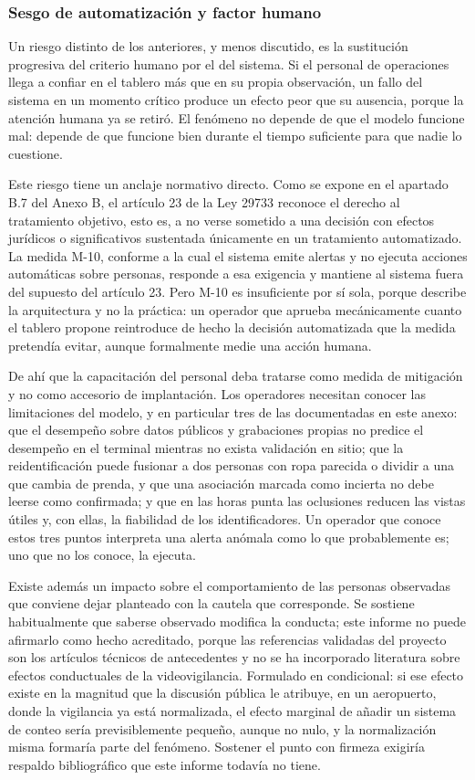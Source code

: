 \subsubsection{Sesgo de automatización y factor humano}

Un riesgo distinto de los anteriores, y menos discutido, es la
sustitución progresiva del criterio humano por el del sistema. Si el
personal de operaciones llega a confiar en el tablero más que en su
propia observación, un fallo del sistema en un momento crítico produce
un efecto peor que su ausencia, porque la atención humana ya se retiró.
El fenómeno no depende de que el modelo funcione mal: depende de que
funcione bien durante el tiempo suficiente para que nadie lo cuestione.

Este riesgo tiene un anclaje normativo directo. Como se expone en el
apartado B.7 del Anexo B, el artículo 23 de la Ley 29733 reconoce el
derecho al tratamiento objetivo, esto es, a no verse sometido a una
decisión con efectos jurídicos o significativos sustentada únicamente en
un tratamiento automatizado. La medida M-10, conforme a la cual el
sistema emite alertas y no ejecuta acciones automáticas sobre personas,
responde a esa exigencia y mantiene al sistema fuera del supuesto del
artículo 23. Pero M-10 es insuficiente por sí sola, porque describe la
arquitectura y no la práctica: un operador que aprueba mecánicamente
cuanto el tablero propone reintroduce de hecho la decisión automatizada
que la medida pretendía evitar, aunque formalmente medie una acción
humana.

De ahí que la capacitación del personal deba tratarse como medida de
mitigación y no como accesorio de implantación. Los operadores necesitan
conocer las limitaciones del modelo, y en particular tres de las
documentadas en este anexo: que el desempeño sobre datos públicos y grabaciones propias no predice
el desempeño en el terminal mientras no exista validación en sitio; que la
reidentificación puede fusionar a dos personas con ropa parecida o dividir a
una que cambia de prenda, y que una asociación marcada como incierta no debe
leerse como confirmada; y que en las horas punta las oclusiones reducen las
vistas útiles y, con ellas, la fiabilidad de los identificadores. Un operador que conoce estos tres puntos
interpreta una alerta anómala como lo que probablemente es; uno que no
los conoce, la ejecuta.

Existe además un impacto sobre el comportamiento de las personas
observadas que conviene dejar planteado con la cautela que corresponde.
Se sostiene habitualmente que saberse observado modifica la conducta;
este informe no puede afirmarlo como hecho acreditado, porque las
referencias validadas del proyecto son los artículos técnicos de
antecedentes y no se ha incorporado literatura sobre efectos
conductuales de la videovigilancia. Formulado en condicional: si ese
efecto existe en la magnitud que la discusión pública le atribuye, en un
aeropuerto, donde la vigilancia ya está normalizada, el efecto marginal
de añadir un sistema de conteo sería previsiblemente pequeño, aunque no
nulo, y la normalización misma formaría parte del fenómeno. Sostener el
punto con firmeza exigiría respaldo bibliográfico que este informe
todavía no tiene.


